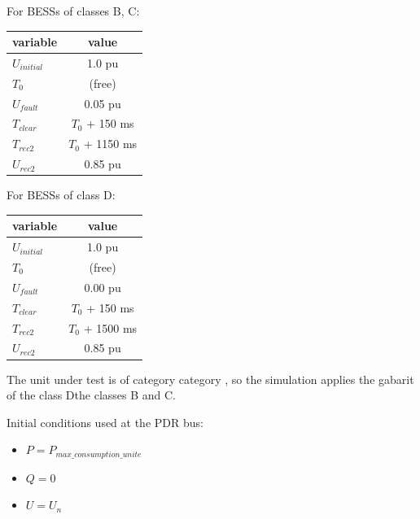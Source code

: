     For BESSs of classes B, C:
    \begin{center}
        \begin{tabular}{lc}
            \toprule
            \textbf{variable} & \textbf{value} \\
            \midrule
            $U_{initial}$     & 1.0 pu                   \\
            $T_{0}$           & (free)                   \\
            $U_{fault}$       & 0.05 pu                  \\
            $T_{clear}$       & $T_{0}$ + 150 ms         \\
            $T_{rec2}$        & $T_{0}$ + 1150 ms        \\
            $U_{rec2}$        & 0.85 pu                  \\
            \bottomrule
        \end{tabular}
    \end{center}

    For BESSs of class D:
    \begin{center}
        \begin{tabular}{lc}
            \toprule
            \textbf{variable} & \textbf{value} \\
            \midrule
            $U_{initial}$     & 1.0 pu                   \\
            $T_{0}$           & (free)                   \\
            $U_{fault}$       & 0.00 pu                  \\
            $T_{clear}$       & $T_{0}$ + 150 ms         \\
            $T_{rec2 }$       & $T_{0}$ + 1500 ms        \\
            $U_{rec2}$        & 0.85 pu                  \\
            \bottomrule
        \end{tabular}
    \end{center}

    \noindent The unit under test is of category {{ category }}, so the simulation
    applies the gabarit of the class Dthe classes B and C.

    \begin{description}
        \item Initial conditions used at the PDR bus:
        \begin{itemize}
            \item $P = P_{max\_consumption\_unite}$
            \item $Q = 0$
            \item $U = U_{n}$
        \end{itemize}
    \end{description}

